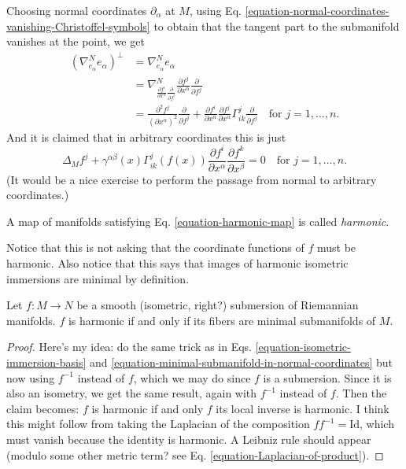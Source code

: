 Choosing normal coordinates $\partial_\alpha$ at $M$, using Eq. 
\ref{equation-normal-coordinates-vanishing-Christoffel-symbols} to obtain
that the tangent part to the submanifold vanishes at the point, we get 
\begin{equation}
\label{equation-minimal-submanifold-in-normal-coordinates}
\begin{aligned}
(\nabla^N_{e_\alpha}e_\alpha)^\perp&=\nabla^N_{e_\alpha}e_\alpha\\
&=\nabla^N
_{\frac{\partial f^i}{\partial x^\alpha}\frac{\partial }{\partial f^i}}
\frac{\partial f^j}{\partial x^\alpha}\frac{\partial }{\partial f^j}\\
&=\frac{\partial^2 f^j}{(\partial x^\alpha)^2}\frac{\partial }{\partial f^j}
+\frac{\partial f^i}{\partial x^\alpha}\frac{\partial f^j}{\partial x^\alpha}
\Gamma^j_{ik}\frac{\partial }{\partial f^j}\quad \text{for }j=1,\ldots,n.
\end{aligned}
\end{equation}
And it is claimed that in arbitrary coordinates this is just
\begin{equation}
\label{equation-harmonic-map}
\Delta_Mf^j+\gamma^{\alpha \beta}(x)\Gamma^j_{ik}(f(x))
\frac{\partial f^i}{\partial x^\alpha}\frac{\partial f^k}{\partial x^\beta}=0
\quad \text{for }j=1,\ldots,n.
\end{equation}
(It would be a nice exercise to perform the passage from normal to arbitrary 
coordinates.)
\begin{definition}
\label{definition-harmonic-map}
A map of manifolds satisfying Eq. \ref{equation-harmonic-map} is
called {\it harmonic}.
\end{definition}
Notice that this is not asking that the coordinate
functions of $f$ must be harmonic. Also notice that this says that images of
harmonic isometric immersions are minimal by definition.

\begin{lemma}
\label{lemma-fibers-of-harmonic-submersion}
Let $f:M\to N$ be a smooth (isometric, right?) submersion of 
Riemannian manifolds. $f$ is
harmonic if and only if its fibers are minimal submanifolds of $M$.
\end{lemma}

\begin{proof}
Here's my idea: do the same trick as in Eqs.
\ref{equation-isometric-immersion-basis} and 
\ref{equation-minimal-submanifold-in-normal-coordinates} but now using
$f^{-1}$ instead of $f$, which we may do since $f$ is a submersion. Since it is
also an isometry, we get the same result, again with $f^{-1}$ instead of $f$.
Then the claim becomes: $f$ is harmonic if and only $f$ its local inverse is
harmonic. I think this might follow from taking the Laplacian of the composition
$f f^{-1}=\text{Id}$, which must vanish because the identity is harmonic. A
Leibniz rule should appear (modulo some other metric term? see Eq.
\ref{equation-Laplacian-of-product}).
\end{proof}

